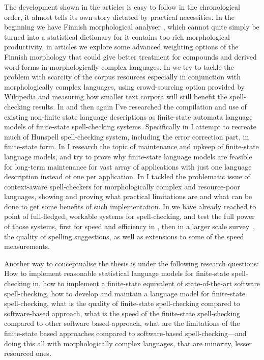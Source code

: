 \documentclass[officiallayout,draft]{unihelcompling}
\begin{document}
The development shown in the articles is easy to follow in the chronological
order, it almost tells its own story dictated by practical necessities. In the
beginning we have Finnish morphological analyser \cite{pirinen2008suomen},
which cannot quite simply be turned into a statistical dictionary for it
contains too rich morphological productivity, in articles
\cite{pirinen2009weighted,pirinen2009weighting} we explore some advanced
weighting options of the Finnish morphology that could give better treatment
for compounds and derived word-forms in morphologically complex languages. In
\cite{pirinen2010finitestate} we try to tackle the problem with scarcity of the
corpus resources especially in conjunction with morphologically complex
languages, using crowd-sourcing option provided by Wikipedia and measuring how
smaller text corpora will still benefit the spell-checking results. In
\cite{pirinen2010building,pirinen2010creating} and then again
\cite{pirinen2012compiling} I've researched the compilation and use of existing
non-finite state language descriptions as finite-state automata language models
of finite-state spell-checking systems. Specifically in
\cite{pirinen2010creating} I attempt to recreate much of Hunspell
spell-checking system, including the error correction part, in finite-state
form. In \cite{pirinen2011modularisation} I research the topic of maintenance
and upkeep of finite-state language models, and try to prove why finite-state
language models are feasible for long-term maintenance for vast array of
applications with just one language description instead of one per application.
In \cite{pirinen2012improving} I tackled the problematic issue of context-aware
spell-checkers for morphologically complex and resource-poor languages, showing
and proving what practical limitations are and what can be done to get some
benefits of such implementation. In
\cite{pirinen2012effects,pirinen2013quality} we have already reached to point
of full-fledged, workable systems for spell-checking, and test the full power
of those systems, first for speed and efficiency in \cite{pirinen2012effects},
then in a larger scale survey~\cite{pirinen2013quality}, the quality of
spelling suggestions, as well as extensions to some of the speed measurements.

Another way to conceptualise the thesis is under the following research
questions: How to implement reasonable statistical language models for
finite-state spell-checking in, how to implement a finite-state equivalent of
state-of-the-art software spell-checking, how to develop and maintain a
language model for finite-state spell-checking, what is the quality of
finite-state spell-checking compared to software-based approach, what is the
speed of the finite-state spell-checking compared to other software
based-approach, what are the limitations of the finite-state based approaches
compared to software-based spell-checking---and doing this all with
morphologically complex languages, that are minority, lesser resourced ones.
\end{document}
